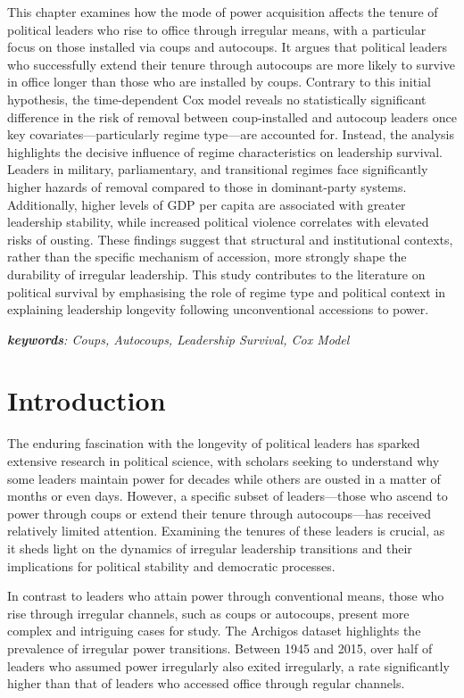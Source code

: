 \documentclass[
  12pt,
]{report}
\begin{document}
This chapter examines how the mode of power acquisition affects the
tenure of political leaders who rise to office through irregular means,
with a particular focus on those installed via coups and autocoups. It
argues that political leaders who successfully extend their tenure
through autocoups are more likely to survive in office longer than those
who are installed by coups. Contrary to this initial hypothesis, the
time-dependent Cox model reveals no statistically significant difference
in the risk of removal between coup-installed and autocoup leaders once
key covariates---particularly regime type---are accounted for. Instead,
the analysis highlights the decisive influence of regime characteristics
on leadership survival. Leaders in military, parliamentary, and
transitional regimes face significantly higher hazards of removal
compared to those in dominant-party systems. Additionally, higher levels
of GDP per capita are associated with greater leadership stability,
while increased political violence correlates with elevated risks of
ousting. These findings suggest that structural and institutional
contexts, rather than the specific mechanism of accession, more strongly
shape the durability of irregular leadership. This study contributes to
the literature on political survival by emphasising the role of regime
type and political context in explaining leadership longevity following
unconventional accessions to power.

\emph{\textbf{keywords}: Coups, Autocoups, Leadership Survival, Cox
Model}

\newpage

\section{Introduction}\label{introduction-3}

The enduring fascination with the longevity of political leaders has
sparked extensive research in political science, with scholars seeking
to understand why some leaders maintain power for decades while others
are ousted in a matter of months or even days. However, a specific
subset of leaders---those who ascend to power through coups or extend
their tenure through autocoups---has received relatively limited
attention. Examining the tenures of these leaders is crucial, as it
sheds light on the dynamics of irregular leadership transitions and
their implications for political stability and democratic processes.

In contrast to leaders who attain power through conventional means,
those who rise through irregular channels, such as coups or autocoups,
present more complex and intriguing cases for study. The Archigos
dataset highlights the prevalence of irregular power transitions.
Between 1945 and 2015, over half of leaders who assumed power
irregularly also exited irregularly, a rate significantly higher than
that of leaders who accessed office through regular channels.
\end{document}
